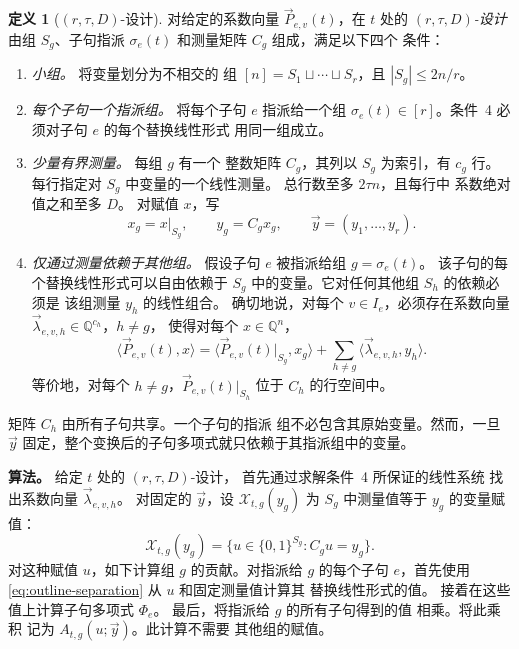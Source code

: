 \documentclass[11pt,reqno]{amsart}
\numberwithin{equation}{section}
\theoremstyle{definition}\newtheorem{definition}[theorem]{定义}
\theoremstyle{remark}\newtheorem{remark}[theorem]{注}
\renewcommand{\le}{\leqslant}
\begin{document}
\begin{definition}[$(r,\tau,D)$-设计]
\label{def:overview-measurement-structure}
对给定的系数向量 $\vec{P}_{e,v}(t)$，在 $t$ 处的
\emph{$(r,\tau,D)$-设计}
由组 $S_g$、子句指派 $\sigma_e(t)$
和测量矩阵 $C_g$ 组成，满足以下四个
条件：
\begin{enumerate}
\item \emph{小组。} 将变量划分为不相交的
组 $[n]=S_1\sqcup\cdots\sqcup S_r$，且 $|S_g|\le2n/r$。
\item \emph{每个子句一个指派组。} 将每个子句
$e$ 指派给一个组 $\sigma_e(t)\in[r]$。条件~4 必须对子句 $e$ 的每个替换线性形式
用同一组成立。
\item \emph{少量有界测量。} 每组 $g$ 有一个
整数矩阵 $C_g$，其列以 $S_g$ 为索引，有 $c_g$ 行。
每行指定对 $S_g$ 中变量的一个线性测量。
总行数至多 $2\tau n$，且每行中
系数绝对值之和至多 $D$。
对赋值 $x$，写
\[
 x_g=x|_{S_g},\qquad y_g=C_gx_g,\qquad
 \vec{y}=(y_1,\ldots,y_r).
\]
\item \emph{仅通过测量依赖于其他组。}
假设子句 $e$ 被指派给组 $g=\sigma_e(t)$。
该子句的每个替换线性形式可以自由依赖于
$S_g$ 中的变量。它对任何其他组 $S_h$ 的依赖必须是
该组测量 $y_h$ 的线性组合。
确切地说，对每个 $v\in I_e$，必须存在系数向量
$\vec{\lambda}_{e,v,h}\in\mathbb Q^{c_h}$，$h\ne g$，
使得对每个 $x\in\mathbb Q^n$，
\begin{equation}\label{eq:outline-separation}
 \langle\vec{P}_{e,v}(t),x\rangle
 =\langle\vec{P}_{e,v}(t)|_{S_g},x_g\rangle
   +\sum_{h\ne g}\langle\vec{\lambda}_{e,v,h},y_h\rangle.
\end{equation}
等价地，对每个 $h\ne g$，$\vec{P}_{e,v}(t)|_{S_h}$ 位于
$C_h$ 的行空间中。
\end{enumerate}
\end{definition}
矩阵 $C_h$ 由所有子句共享。一个子句的指派
组不必包含其原始变量。然而，一旦 $\vec{y}$
固定，整个变换后的子句多项式就只依赖于其指派组中的变量。

\smallskip\noindent
\textbf{算法。}
给定 $t$ 处的 $(r,\tau,D)$-设计，
首先通过求解条件~4 所保证的线性系统
找出系数向量 $\vec{\lambda}_{e,v,h}$。
对固定的 $\vec{y}$，设 $\mathcal X_{t,g}(y_g)$ 为
$S_g$ 中测量值等于 $y_g$ 的变量赋值：
\[
 \mathcal X_{t,g}(y_g)
 =\{u\in\{0,1\}^{S_g}:C_gu=y_g\}.
\]
对这种赋值 $u$，如下计算组 $g$ 的贡献。对指派给 $g$ 的每个子句 $e$，首先使用
\eqref{eq:outline-separation} 从 $u$ 和固定测量值计算其
替换线性形式的值。
接着在这些值上计算子句多项式 $\Phi_e$。
最后，将指派给 $g$ 的所有子句得到的值
相乘。将此乘积
记为 $A_{t,g}(u;\vec{y})$。此计算不需要
其他组的赋值。
\end{document}

